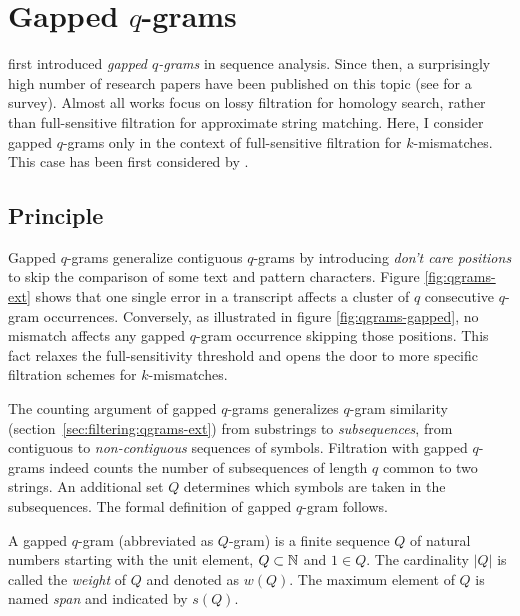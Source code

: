 
\section{Gapped $q$-grams}
\label{sec:filtering:qgrams-gapped}

\cite{Califano1993} first introduced \emph{gapped $q$-grams} in sequence analysis.
Since then, a surprisingly high number of research papers have been published on this topic (see \citep{Brown2008} for a survey).
Almost all works focus on lossy filtration for homology search, rather than full-sensitive filtration for approximate string matching.
Here, I consider gapped $q$-grams only in the context of full-sensitive filtration for $k$-mismatches.
This case has been first considered by \cite{Burkhardt2001}.

\subsection{Principle}

Gapped $q$-grams generalize contiguous $q$-grams by introducing \emph{don't care positions} to skip the comparison of some text and pattern characters.
Figure \ref{fig:qgrams-ext} shows that one single error in a transcript affects a cluster of $q$ consecutive $q$-gram occurrences.
Conversely, as illustrated in figure \ref{fig:qgrams-gapped}, no mismatch affects any gapped $q$-gram occurrence skipping those positions.
This fact relaxes the full-sensitivity threshold and opens the door to more specific filtration schemes for $k$-mismatches.

The counting argument of gapped $q$-grams generalizes $q$-gram similarity (section~\ref{sec:filtering:qgrams-ext}) from substrings to \emph{subsequences}, \ie from contiguous to \emph{non-contiguous} sequences of symbols.
Filtration with gapped $q$-grams indeed counts the number of subsequences of length $q$ common to two strings.
An additional set $Q$ determines which symbols are taken in the subsequences.
The formal definition of gapped $q$-gram follows.

\begin{definition}
A gapped $q$-gram (abbreviated as $Q$-gram) is a finite sequence $Q$ of natural numbers starting with the unit element, \ie $Q \subset \mathbb {N}$ and $1 \in Q$.
The cardinality $|Q|$ is called the \emph{weight} of $Q$ and denoted as $w(Q)$.
The maximum element of $Q$ is named \emph{span} and indicated by $s(Q)$.
\end{definition}

